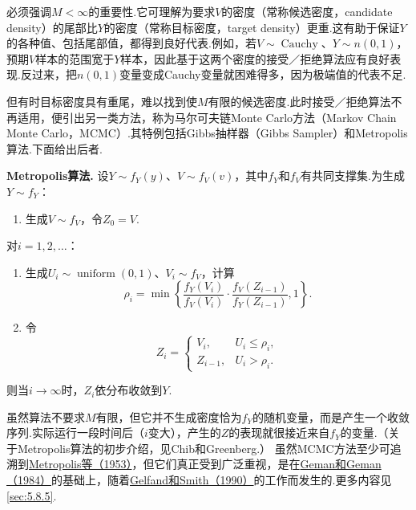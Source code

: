 必须强调$M<\infty$的重要性.它可理解为要求$V$的密度（常称候选密度，candidate density）的尾部比$Y$的密度（常称目标密度，target density）更重.这有助于保证$Y$的各种值、包括尾部值，都得到良好代表.例如，若$V\sim\operatorname{Cauchy}$、$Y\sim n(0,1)$，预期$V$样本的范围宽于$Y$样本，因此基于这两个密度的接受／拒绝算法应有良好表现.反过来，把$n(0,1)$变量变成Cauchy变量就困难得多，因为极端值的代表不足.

但有时目标密度具有重尾，难以找到使$M$有限的候选密度.此时接受／拒绝算法不再适用，便引出另一类方法，称为马尔可夫链Monte Carlo方法（Markov Chain Monte Carlo，MCMC）.其特例包括Gibbs抽样器（Gibbs Sampler）和Metropolis算法.下面给出后者.

\noindent\textbf{Metropolis算法.} 设$Y\sim f_Y(y)$、$V\sim f_V(v)$，其中$f_Y$和$f_V$有共同支撑集.为生成$Y\sim f_Y$：
\begin{enumerate}[label=\arabic*.,start=0]
\item 生成$V\sim f_V$，令$Z_0=V$.
\end{enumerate}
对$i=1,2,\ldots$：
\begin{enumerate}[label=\arabic*.]
\item 生成$U_i\sim\operatorname{uniform}(0,1)$、$V_i\sim f_V$，计算
$$\rho_i=\min\left\{\frac{f_Y(V_i)}{f_V(V_i)}\cdot\frac{f_V(Z_{i-1})}{f_Y(Z_{i-1})},1\right\}.$$
\item 令
$$Z_i=\begin{cases}V_i,&U_i\le\rho_i,\\Z_{i-1},&U_i>\rho_i.\end{cases}$$
\end{enumerate}
则当$i\to\infty$时，$Z_i$依分布收敛到$Y$.

虽然算法不要求$M$有限，但它并不生成密度恰为$f_Y$的随机变量，而是产生一个收敛序列.实际运行一段时间后（$i$变大），产生的$Z$的表现就很接近来自$f_Y$的变量.（关于Metropolis算法的初步介绍，见Chib和Greenberg.）
虽然MCMC方法至少可追溯到\hyperref[bib:source219]{Metropolis等（1953）}，但它们真正受到广泛重视，是在\hyperref[bib:source137]{Geman和Geman（1984）}的基础上，随着\hyperref[bib:source134]{Gelfand和Smith（1990）}的工作而发生的.更多内容见\autoref{sec:5.8.5}.
